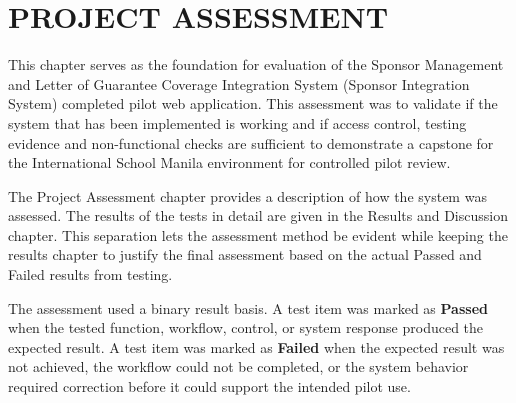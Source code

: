 
\section{PROJECT ASSESSMENT}

This chapter serves as the foundation for evaluation of the Sponsor Management and Letter of Guarantee Coverage Integration System (Sponsor Integration System) completed pilot web application. This assessment was to validate if the system that has been implemented is working and if access control, testing evidence and non-functional checks are sufficient to demonstrate a capstone for the International School Manila environment for controlled pilot review.

The Project Assessment chapter provides a description of how the system was assessed. The results of the tests in detail are given in the Results and Discussion chapter. This separation lets the assessment method be evident while keeping the results chapter to justify the final assessment based on the actual Passed and Failed results from testing.

The assessment used a binary result basis. A test item was marked as \textbf{Passed} when the tested function, workflow, control, or system response produced the expected result. A test item was marked as \textbf{Failed} when the expected result was not achieved, the workflow could not be completed, or the system behavior required correction before it could support the intended pilot use.

